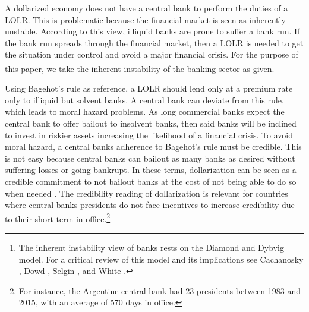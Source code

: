 \documentclass[12pt]{article}
\begin{document}
A dollarized economy does not have a central bank to perform the duties of a LOLR. This is problematic because the financial market is seen as inherently unstable. According to this view, illiquid banks are prone to suffer a bank run. If the bank run spreads through the financial market, then a LOLR is needed to get the situation under control and avoid a major financial crisis. For the purpose of this paper, we take the inherent instability of the banking sector as given.\footnote{The inherent instability view of banks rests on the Diamond and Dybvig \parencite*{Diamond1983} model. For a critical review of this model and its implications see Cachanosky \parencite*[][Ch. 1]{Cachanosky2018a}, Dowd \parencite*{Dowd1992a}, Selgin \parencite*[][Ch. 11]{Selgin1996c}, and White \parencite*[][Ch. 6]{White1999c}.}

Using Bagehot's rule as reference, a LOLR should lend only at a premium rate only to illiquid but solvent banks. A central bank can deviate from this rule, which leads to moral hazard problems. As long commercial banks expect the central bank to offer bailout to insolvent banks, then said banks will be inclined to invest in riskier assets increasing the likelihood of a financial crisis. To avoid moral hazard, a central banks adherence to Bagehot's rule must be credible. This is not easy because central banks can bailout as many banks as desired without suffering losses or going bankrupt. In these terms, dollarization can be seen as a credible commitment to not bailout banks at the cost of not being able to do so when needed \parencite{Gale2002}. The credibility reading of dollarization is relevant for countries where central banks presidents do not face incentives to increase credibility due to their short term in office.\footnote{For instance, the Argentine central bank had 23 presidents between 1983 and 2015, with an average of 570 days in office.}
\end{document}
